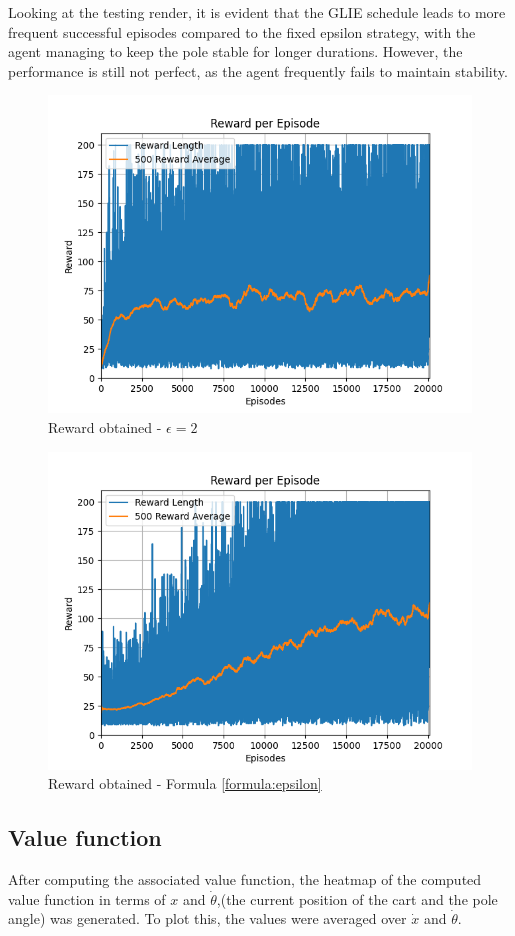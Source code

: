 \documentclass{article}
\begin{document}
Looking at the testing render, it is evident that the GLIE schedule leads to more frequent successful episodes compared to the fixed epsilon strategy, with the agent managing to keep the pole stable for longer durations. However, the performance is still not perfect, as the agent frequently fails to maintain stability.


\begin{figure}[h]
	\centering
	\includegraphics[width=0.5\linewidth]{../data/plot/q_learning_constant_0.2.png}
	\caption{Reward obtained - $\epsilon = 2$}
	\label{fig:costant_eps}
\end{figure}

\begin{figure}[h]
	\centering
	\includegraphics[width=0.5\linewidth]{../data/plot/q_learning_GLIE.png}
	\caption{Reward obtained - Formula \ref{formula:epsilon}}
	\label{fig:glie_eps}
\end{figure}

\subsection{Value function}
After computing the associated value function, the heatmap of the computed value function in terms of $ x $ and $\dot{\theta}$,(the current position of the cart and the pole angle) was generated. To plot this, the values were averaged over $\dot{x} $ and $\dot{\theta} $.
\end{document}
